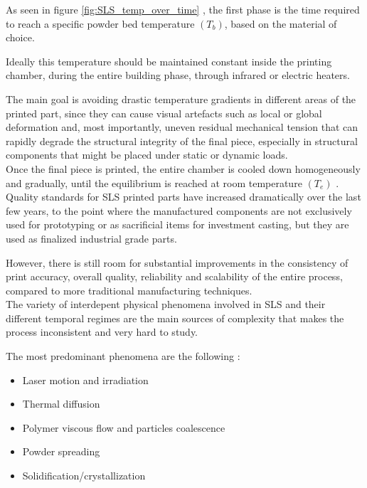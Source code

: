 \documentclass{article}
\begin{document}
    As seen in figure \ref{fig:SLS_temp_over_time} \autocites{Inkscape}, the first phase is the time required to reach a specific powder bed temperature $(T_b)$, based on the material of choice. 

    Ideally this temperature should be maintained constant inside the printing
    chamber, during the entire building phase, through infrared or electric heaters. 
    
    The main goal is avoiding drastic temperature gradients in different areas of the printed part, since they can cause 
    visual artefacts such as local or global deformation and, most importantly, uneven residual mechanical tension that can 
    rapidly degrade the structural integrity of the final piece, especially in structural components that might be placed under static or
    dynamic loads. \\ 
    
    Once the final piece is printed, the entire chamber is cooled down homogeneously and gradually, until the equilibrium is reached at room 
    temperature $(T_e)$ \autocite*{Padovano_SLS_Review}. \\ 

    Quality standards for SLS printed parts have increased dramatically over the last few years, to the point where 
    the manufactured components are not exclusively used for prototyping or as sacrificial items for investment casting, but they are 
    used as finalized industrial grade parts. 

    However, there is still room for substantial improvements in the consistency of print accuracy, overall quality, reliability 
    and scalability of the entire process, compared to more traditional manufacturing techniques. \\ 

    The variety of interdepent physical phenomena involved in SLS and their different temporal regimes are the main 
    sources of complexity that makes the process inconsistent and very hard to study. 

    The most predominant phenomena are the following \autocite*{Padovano_SLS_Review}: 

    \begin{itemize}
        \item Laser motion and irradiation
        \item Thermal diffusion
        \item Polymer viscous flow and particles coalescence 
        \item Powder spreading
        \item Solidification/crystallization 
    \end{itemize} 
    
\end{document}
